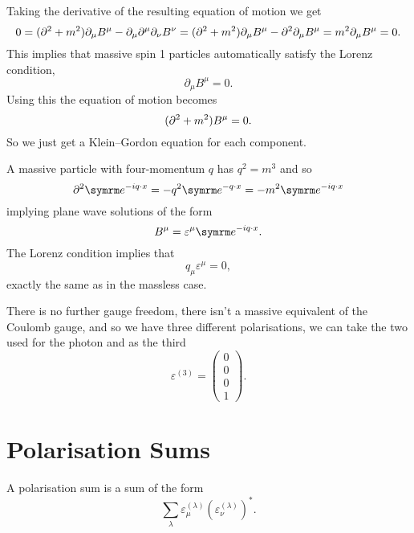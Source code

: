 Taking the derivative of the resulting equation of motion we get
\begin{equation}
    0 = (\partial^2 + m^2) \partial_\mu B^\mu - \partial_\mu\partial^\mu\partial_\nu B^\nu = (\partial^2 + m^2) \partial_\mu B^\mu - \partial^2 \partial_\mu B^\mu = m^2\partial_\mu B^\mu = 0.
\end{equation}
This implies that massive spin 1 particles automatically satisfy the Lorenz condition,
\begin{equation}
    \partial_\mu B^\mu = 0.
\end{equation}
Using this the equation of motion becomes
\begin{equation}
    (\partial^2 + m^2) B^\mu = 0.
\end{equation}
So we just get a Klein--Gordon equation for each component.

A massive particle with four-momentum \(q\) has \(q^2 = m^3\) and so
\begin{equation}
    \dalembertian \e^{-iq\cdot x} = -q^2\e^{-q\cdot x} = -m^2\e^{-iq\cdot x}
\end{equation}
implying plane wave solutions of the form
\begin{equation}
    B^\mu = \varepsilon^\mu \e^{-iq\cdot x}.
\end{equation}
The Lorenz condition implies that
\begin{equation}
    q_\mu \varepsilon^\mu = 0,
\end{equation}
exactly the same as in the massless case.

There is no further gauge freedom, there isn't a massive equivalent of the Coulomb gauge, and so we have three different polarisations, we can take the two used for the photon and as the third
\begin{equation}
    \varepsilon^{(3)} = 
    \begin{pmatrix}
        0\\ 0\\ 0\\ 1
    \end{pmatrix}
    .
\end{equation}

\section{Polarisation Sums}
A polarisation sum is a sum of the form
\begin{equation}
    \sum_\lambda \varepsilon^{(\lambda)}_\mu (\varepsilon^{(\lambda)}_\nu)^*.
\end{equation}

